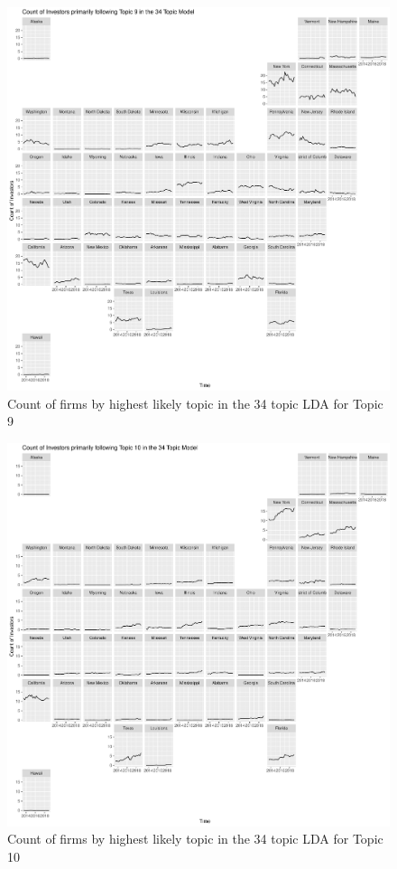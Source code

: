 		\begin{figure}
		\centering
		\includegraphics[width=1\linewidth]{Figures/ChapterV/USA_34_Topic09.pdf}
		\caption[Count of Firms for Topic 9 by Quarter]{Count of firms by highest likely topic in the 34 topic LDA for Topic 9}
		\label{fig:StateLDA9}
	\end{figure}
	
		\begin{figure}
		\centering
		\includegraphics[width=1\linewidth]{Figures/ChapterV/USA_34_Topic10.pdf}
		\caption[Count of Firms for Topic 10 by Quarter]{Count of firms by highest likely topic in the 34 topic LDA for Topic 10}
		\label{fig:StateLDA10}
	\end{figure}
	
